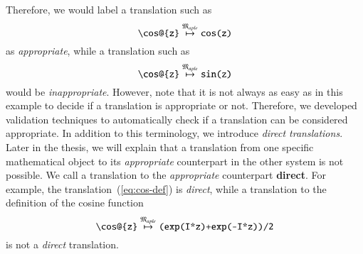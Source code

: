 Therefore, we would label a translation such as
\begin{equation}\label{eq:cos-def}
\verb|\cos@{z}| \overset{\langMaple}{\mapsto} \verb|cos(z)|
\end{equation}
as \textit{appropriate}, while a translation such as
\begin{equation}
\verb|\cos@{z}| \overset{\langMaple}{\mapsto} \verb|sin(z)|
\end{equation}
would be \textit{inappropriate}. However, note that it is not always as easy as in this example to decide if a translation is appropriate or not. Therefore, we developed validation techniques to automatically check if a translation can be considered appropriate. In addition to this terminology, we introduce \textit{direct translations}. Later in the thesis, we will explain that a translation from one specific mathematical object to its \textit{appropriate} counterpart in the other system is not possible. We call a translation to the \textit{appropriate} counterpart \textbf{direct}. For example, the translation~(\ref{eq:cos-def}) is \textit{direct}, while a translation to the definition of the cosine function
\begin{equation}
\verb|\cos@{z}| \overset{\langMaple}{\mapsto} \verb|(exp(I*z)+exp(-I*z))/2|
\end{equation}
is not a \textit{direct} translation.